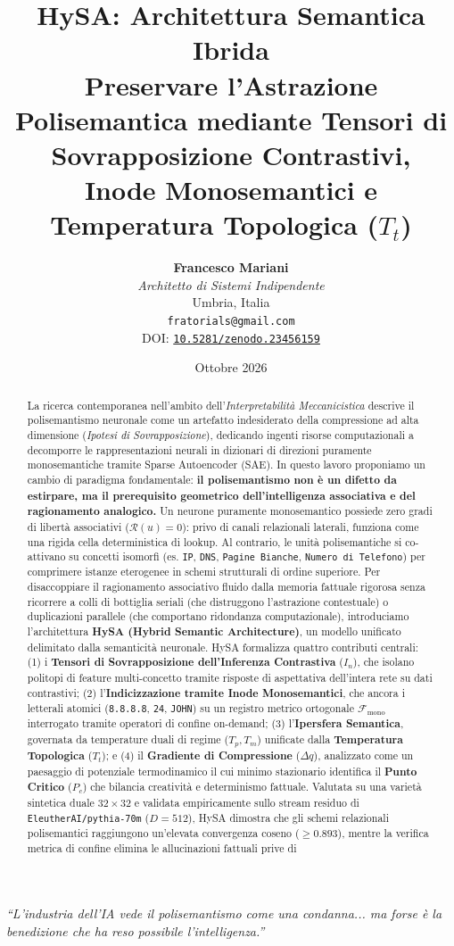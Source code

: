 \documentclass[11pt,a4paper]{article}
\title{\vspace{-0.8cm}\textbf{\LARGE HySA: Architettura Semantica Ibrida \\ \Large Preservare l'Astrazione Polisemantica mediante Tensori di Sovrapposizione Contrastivi, \\ Inode Monosemantici e Temperatura Topologica \texorpdfstring{($T_t$)}{(Tt)}}}
\author{
    \textbf{Francesco Mariani} \\
    \textit{Architetto di Sistemi Indipendente} \\
    Umbria, Italia \\
    \texttt{fratorials@gmail.com} \\
    {\footnotesize DOI: \href{https://doi.org/10.5281/zenodo.23456159}{\texttt{10.5281/zenodo.23456159}}}
}
\date{Ottobre 2026}
\theoremstyle{definition}
\begin{document}
\maketitle

\begin{center}
    \vspace{-0.35cm}
    \textit{``L'industria dell'IA vede il polisemantismo come una condanna... ma forse è la benedizione che ha reso possibile l'intelligenza.''}
    \vspace{0.35cm}
\end{center}

\begin{abstract}
\noindent La ricerca contemporanea nell'ambito dell'\textit{Interpretabilit\`a Meccanicistica} descrive il polisemantismo neuronale come un artefatto indesiderato della compressione ad alta dimensione (\textit{Ipotesi di Sovrapposizione}), dedicando ingenti risorse computazionali a decomporre le rappresentazioni neurali in dizionari di direzioni puramente monosemantiche tramite Sparse Autoencoder (SAE). In questo lavoro proponiamo un cambio di paradigma fondamentale: \textbf{il polisemantismo non è un difetto da estirpare, ma il prerequisito geometrico dell'intelligenza associativa e del ragionamento analogico.} Un neurone puramente monosemantico possiede zero gradi di libertà associativi ($\mathcal{R}(u)=0$): privo di canali relazionali laterali, funziona come una rigida cella deterministica di lookup. Al contrario, le unità polisemantiche si co-attivano su concetti isomorfi (es. \texttt{IP}, \texttt{DNS}, \texttt{Pagine Bianche}, \texttt{Numero di Telefono}) per comprimere istanze eterogenee in schemi strutturali di ordine superiore. Per disaccoppiare il ragionamento associativo fluido dalla memoria fattuale rigorosa senza ricorrere a colli di bottiglia seriali (che distruggono l'astrazione contestuale) o duplicazioni parallele (che comportano ridondanza computazionale), introduciamo l'architettura \textbf{HySA (Hybrid Semantic Architecture)}, un modello unificato delimitato dalla semanticità neuronale. HySA formalizza quattro contributi centrali: (1) i \textbf{Tensori di Sovrapposizione dell'Inferenza Contrastiva} ($I_n$), che isolano politopi di feature multi-concetto tramite risposte di aspettativa dell'intera rete su dati contrastivi; (2) l'\textbf{Indicizzazione tramite Inode Monosemantici}, che ancora i letterali atomici (\texttt{8.8.8.8}, \texttt{24}, \texttt{JOHN}) su un registro metrico ortogonale $\mathcal{F}_{\mathrm{mono}}$ interrogato tramite operatori di confine on-demand; (3) l'\textbf{Ipersfera Semantica}, governata da temperature duali di regime ($T_p, T_m$) unificate dalla \textbf{Temperatura Topologica} ($T_t$); e (4) il \textbf{Gradiente di Compressione} ($\Delta q$), analizzato come un paesaggio di potenziale termodinamico il cui minimo stazionario identifica il \textbf{Punto Critico} ($P_c$) che bilancia creatività e determinismo fattuale. Valutata su una varietà sintetica duale $32 \times 32$ e validata empiricamente sullo stream residuo di \texttt{EleutherAI/pythia-70m} ($D=512$), HySA dimostra che gli schemi relazionali polisemantici raggiungono un'elevata convergenza coseno ($\ge 0.893$), mentre la verifica metrica di confine elimina le allucinazioni fattuali prive di 
\end{abstract}
\end{document}
